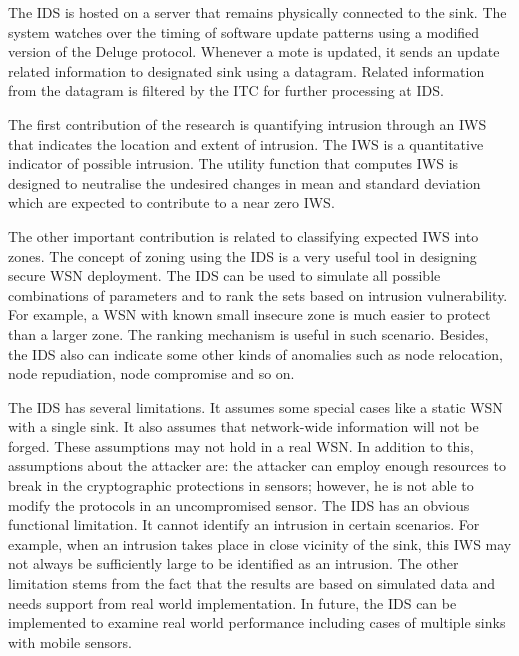 \documentclass[conference]{IEEEtran}
\begin{document}
The IDS is hosted on a server that remains physically connected to the  sink. 
The system watches over the timing of software update patterns using a modified version of the Deluge protocol.
Whenever a mote is updated, it sends an update related information to designated sink using a datagram.  
Related information from the datagram is filtered by the ITC for further processing at IDS.

The first contribution of the research is quantifying intrusion through an IWS that indicates the location and extent of intrusion.
The IWS is a quantitative indicator of possible intrusion.
The utility function that computes IWS is designed to neutralise the undesired %
changes in mean and standard deviation which are expected to contribute to a near zero IWS.

The other important contribution is related to classifying expected IWS into zones.
The concept of zoning using the IDS is a very useful tool in designing secure WSN deployment.
The IDS can be used to simulate all possible combinations of parameters and  to rank the sets based on intrusion vulnerability.
For example, a WSN with known small insecure zone is much easier to protect than a larger zone.
The ranking mechanism is useful in such scenario.
Besides, the IDS also can indicate some other kinds of anomalies such as node relocation, node repudiation, node compromise and so on.

The IDS has several limitations. 
It assumes some special cases like a static WSN with a single sink.
It also assumes that network-wide information will not be forged. %
These assumptions may not hold in a real WSN.
In addition to this, assumptions about the attacker are: the attacker can employ enough resources to break in the cryptographic protections in sensors; however, he is not able to modify the protocols in an uncompromised sensor.
The IDS has an obvious functional limitation.
It cannot identify an intrusion in certain scenarios.
For example, when an intrusion takes place in close vicinity of the sink, this IWS may not always be sufficiently large to be identified as an intrusion.
The other limitation stems from the fact that the results are based on simulated data and needs support from real world implementation.
In future,  the IDS can be implemented to examine real world performance including cases of multiple sinks with mobile sensors.






\IEEEtriggercmd{\enlargethispage{-5in}}






\end{document}
